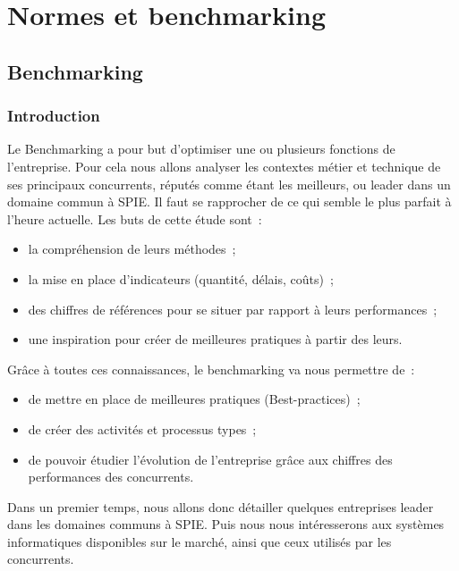 \chapter{Normes et benchmarking}
\section{Benchmarking}
\subsection{Introduction}
	Le Benchmarking a pour but d'optimiser une ou plusieurs fonctions de l'entreprise. Pour cela nous allons analyser les contextes métier et technique de ses principaux concurrents, réputés comme étant les meilleurs, ou leader dans un domaine commun à SPIE. Il faut se rapprocher de ce qui semble le plus parfait à l'heure actuelle.
	Les buts de cette étude sont~:
\begin{itemize}
	\item la compréhension de leurs méthodes~;
	\item la mise en place d'indicateurs (quantité, délais, coûts)~;
	\item des chiffres de références pour se situer par rapport à leurs performances~;
	\item une inspiration pour créer de meilleures pratiques à partir des leurs.
\end{itemize}
	Grâce à toutes ces connaissances, le benchmarking va nous permettre de~:
\begin{itemize}
	\item de mettre en place de meilleures pratiques (Best-practices)~;
	\item de créer des activités et processus types~;
	\item de pouvoir étudier l'évolution de l'entreprise grâce aux chiffres des performances des concurrents.
\end{itemize}

	Dans un premier temps, nous allons donc détailler quelques entreprises leader dans les domaines communs à SPIE. Puis nous nous intéresserons aux systèmes informatiques disponibles sur le marché, ainsi que ceux utilisés par les concurrents.
